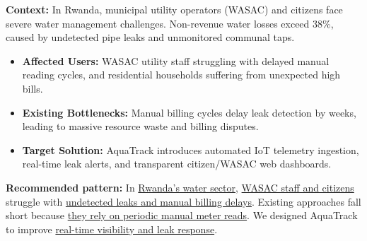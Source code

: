 

\textbf{Context:} In Rwanda, municipal utility operators (WASAC) and citizens face severe water management challenges. Non-revenue water losses exceed 38\%, caused by undetected pipe leaks and unmonitored communal taps.

\begin{itemize}
  \item \textbf{Affected Users:} WASAC utility staff struggling with delayed manual reading cycles, and residential households suffering from unexpected high bills.
  \item \textbf{Existing Bottlenecks:} Manual billing cycles delay leak detection by weeks, leading to massive resource waste and billing disputes.
  \item \textbf{Target Solution:} AquaTrack introduces automated IoT telemetry ingestion, real-time leak alerts, and transparent citizen/WASAC web dashboards.
\end{itemize}

\textbf{Recommended pattern:} In \underline{Rwanda's water sector}, \underline{WASAC staff and citizens} struggle with \underline{undetected leaks and manual billing delays}. Existing approaches fall short because \underline{they rely on periodic manual meter reads}. We designed AquaTrack to improve \underline{real-time visibility and leak response}.
